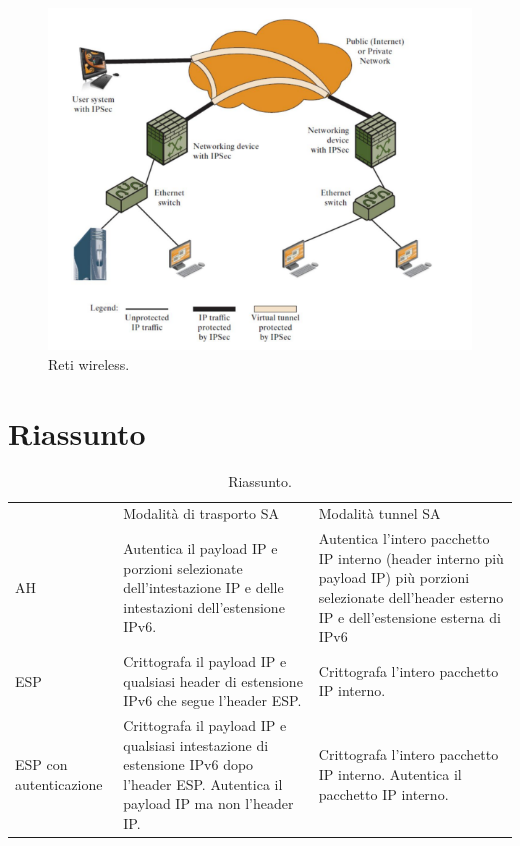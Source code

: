 \begin{figure}[h]
    \centering
    \includegraphics[width=1\textwidth]{images/chapter9/9-11.png}
    \caption{Reti wireless.}
    \label{fig:9-11}
\end{figure}

\section{Riassunto}

\begin{table}[h]
    \centering
    \begin{tabular}{ |p{}|p{}|p{}| }
         \hline
          & Modalità di trasporto SA & Modalità tunnel SA \\ 
         AH & Autentica il payload IP e porzioni selezionate dell'intestazione IP e delle intestazioni dell'estensione IPv6. & Autentica l'intero pacchetto IP interno (header interno più payload IP) più porzioni selezionate dell'header esterno IP e dell'estensione esterna di IPv6 \\ 
         ESP & Crittografa il payload IP e qualsiasi header di estensione IPv6 che segue l'header ESP. & Crittografa l'intero pacchetto IP interno. \\ 
         ESP con autenticazione & Crittografa il payload IP e qualsiasi intestazione di estensione IPv6 dopo l'header ESP. Autentica il payload IP ma non l'header IP.& Crittografa l'intero pacchetto IP interno. Autentica il pacchetto IP interno. \\ 
         \hline
    \end{tabular}
    \caption{Riassunto.}
    \label{tab:table9-1}
\end{table}

